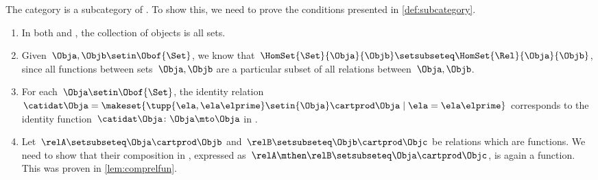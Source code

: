\begin{example}
    The category \Set is a subcategory of \Rel.
    To show this, we need to prove the conditions presented in \cref{def:subcategory}.
    \begin{enumerate}
        \item In both \Rel and \Set, the collection of objects is all sets.
        \item Given~$\Obja,\Objb\setin \Obof{\Set}$, we know that~$\HomSet{\Set}{\Obja}{\Objb}\setsubseteq \HomSet{\Rel}{\Obja}{\Objb}$, since all functions between sets~$\Obja,\Objb$ are a particular subset of all relations between~$\Obja,\Objb$.
        \item For each~$\Obja \setin \Obof{\Set}$, the identity relation~$\catidat\Obja=\makeset{\tupp{\ela,\ela\elprime}\setin {\Obja} \cartprod \Obja \mid \ela=\ela\elprime}$ corresponds to the identity function~$\catidat\Obja \colon \Obja \mto \Obja$ in \Set.
        \item Let~$\relA\setsubseteq \Obja\cartprod \Objb$ and~$\relB\setsubseteq \Objb \cartprod \Objc$ be relations which are functions.
              We need to show that their composition in \Rel, expressed as~$\relA\mthen \relB\setsubseteq \Obja\cartprod \Objc$, is again a function.
              This was proven in \cref{lem:comprelfun}.
    \end{enumerate}
\end{example}
